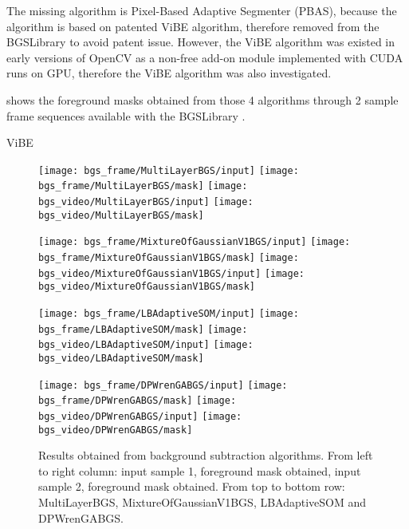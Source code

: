 The missing algorithm is Pixel-Based Adaptive Segmenter (PBAS), because the algorithm is based on patented ViBE algorithm, therefore removed from the BGSLibrary to avoid patent issue. However, the ViBE algorithm was existed in early versions of OpenCV as a non-free add-on module implemented with CUDA runs on GPU, therefore the ViBE algorithm was also investigated.

 shows the foreground masks obtained from those 4 algorithms through 2 sample frame sequences available with the BGSLibrary \cite{bgslibrary}.

{\color{red}ViBE}

\begin{figure}[H]
  \centering
  \texttt{[image: bgs\_frame/MultiLayerBGS/input]}
  \texttt{[image: bgs\_frame/MultiLayerBGS/mask]}
  \texttt{[image: bgs\_video/MultiLayerBGS/input]}
  \texttt{[image: bgs\_video/MultiLayerBGS/mask]}

  \texttt{[image: bgs\_frame/MixtureOfGaussianV1BGS/input]}
  \texttt{[image: bgs\_frame/MixtureOfGaussianV1BGS/mask]}
  \texttt{[image: bgs\_video/MixtureOfGaussianV1BGS/input]}
  \texttt{[image: bgs\_video/MixtureOfGaussianV1BGS/mask]}

  \texttt{[image: bgs\_frame/LBAdaptiveSOM/input]}
  \texttt{[image: bgs\_frame/LBAdaptiveSOM/mask]}
  \texttt{[image: bgs\_video/LBAdaptiveSOM/input]}
  \texttt{[image: bgs\_video/LBAdaptiveSOM/mask]}

  \texttt{[image: bgs\_frame/DPWrenGABGS/input]}
  \texttt{[image: bgs\_frame/DPWrenGABGS/mask]}
  \texttt{[image: bgs\_video/DPWrenGABGS/input]}
  \texttt{[image: bgs\_video/DPWrenGABGS/mask]}
  \caption{Results obtained from background subtraction algorithms. From left to right column: input sample 1, foreground mask obtained, input sample 2, foreground mask obtained. From top to bottom row: MultiLayerBGS, MixtureOfGaussianV1BGS, LBAdaptiveSOM and DPWrenGABGS.}
  \label{Figure:bgs_frame}
\end{figure}

